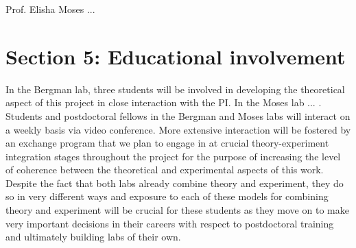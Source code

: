 Prof. Elisha Moses ...

\section{Section 5: Educational involvement}
In the Bergman lab, three students will be involved in developing the theoretical aspect of this project in close interaction with the PI. In the Moses lab ... . Students and postdoctoral fellows in the Bergman and Moses labs will interact on a weekly basis via video conference. More extensive interaction will be fostered by an exchange program that we plan to engage in at crucial theory-experiment integration stages throughout the project for the purpose of increasing the level of coherence between the theoretical and experimental aspects of this work. Despite the fact that both labs already combine theory and experiment, they do so in very different ways and exposure to each of these models for combining theory and experiment will be crucial for these students as they move on to make very important decisions in their careers with respect to postdoctoral training and ultimately building labs of their own.